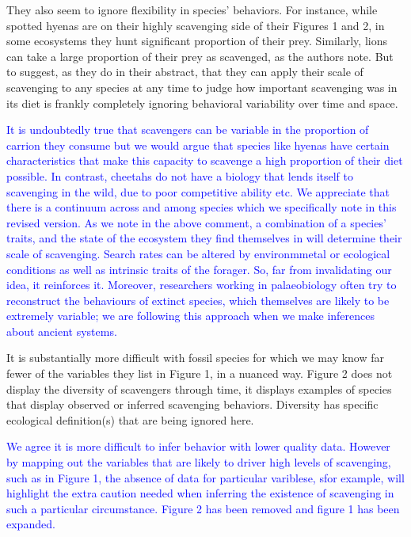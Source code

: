 \documentclass[12pt,letterpaper]{article}
\begin{document}
They also seem to ignore flexibility in species' behaviors.
For instance, while spotted hyenas are on their highly scavenging side of their Figures 1 and 2, in some ecosystems they hunt significant proportion of their prey.
Similarly, lions can take a large proportion of their prey as scavenged, as the authors note.
But to suggest, as they do in their abstract, that they can apply their scale of scavenging to any species at any time to judge how important scavenging was in its diet is frankly completely ignoring behavioral variability over time and space. 
\bigskip

\textcolor{blue}{It is undoubtedly true that scavengers can be variable in the proportion of carrion they consume but we would argue that species like hyenas have certain characteristics that make this capacity to scavenge  a high proportion of their diet possible.
In contrast, cheetahs do not have a biology that lends itself to scavenging in the wild, due to poor competitive ability etc.
We appreciate that there is a continuum across and among species which we specifically note in this revised version. 
As we note in the above comment, a combination of a species' traits, and the state of the ecosystem they find themselves in will determine their scale of scavenging. 
Search rates can be altered by environmmetal or ecological conditions as well as intrinsic traits of the forager. 
So, far from invalidating our idea, it reinforces it.
Moreover, researchers working in palaeobiology often try to reconstruct the behaviours of extinct species, which themselves are likely to be extremely variable; we are following this approach when we make inferences about ancient systems.}
\bigskip

It is substantially more difficult with fossil species for which we may know far fewer of the variables they list in Figure 1, in a nuanced way.
Figure 2 does not display the diversity of scavengers through time, it displays examples of species that display observed or inferred scavenging behaviors.
Diversity has specific ecological definition(s) that are being ignored here.
\bigskip

\textcolor{blue}{We agree it is more difficult to infer behavior with lower quality data. However by mapping out the variables that are likely to driver high levels of scavenging, such as in Figure 1, the absence of data for particular variblese, sfor example, will highlight the extra caution needed when inferring the existence of scavenging in such a particular circumstance.}
\textcolor{blue}{Figure 2 has been removed and figure 1 has been expanded.}
\end{document}

